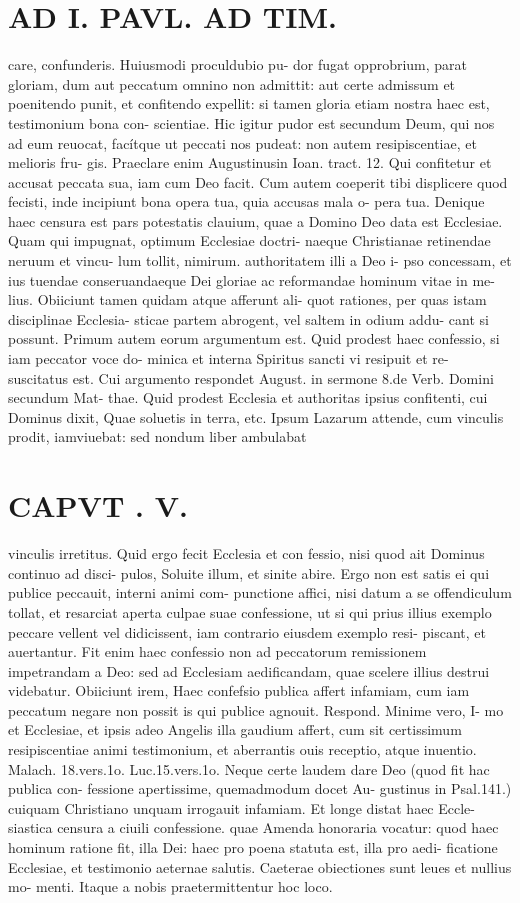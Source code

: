 \documentclass{article}
\begin{document}
\begin{pages}
\section*{AD I. PAVL. AD TIM. }
\marginpar{[ p.326 ]}care, confunderis. Huiusmodi proculdubio pu- dor fugat opprobrium, parat gloriam, dum aut peccatum omnino non admittit: aut certe admissum et poenitendo punit, et confitendo expellit: si tamen gloria etiam nostra haec est, testimonium bona con- scientiae. Hic igitur pudor est secundum Deum, qui nos ad eum reuocat, facítque ut peccati nos pudeat: non autem resipiscentiae, et melioris fru- gis. Praeclare enim Augustinusin Ioan. tract. 12. Qui confitetur et accusat peccata sua, iam cum Deo facit. Cum autem coeperit tibi displicere quod fecisti, inde incipiunt bona opera tua, quia accusas mala o- pera tua. Denique haec censura est pars potestatis clauium, quae a Domino Deo data est Ecclesiae. Quam qui impugnat, optimum Ecclesiae doctri- naeque Christianae retinendae neruum et vincu- lum tollit, nimirum. authoritatem illi a Deo i- pso concessam, et ius tuendae conseruandaeque Dei gloriae ac reformandae hominum vitae in me- lius. Obiiciunt tamen quidam atque afferunt ali- quot rationes, per quas istam disciplinae Ecclesia- sticae partem abrogent, vel saltem in odium addu- cant si possunt. Primum autem eorum argumentum est. Quid prodest haec confessio, si iam peccator voce do- minica et interna Spiritus sancti vi resipuit et re- suscitatus est. Cui argumento respondet August. in sermone 8.de Verb. Domini secundum Mat- thae. Quid prodest Ecclesia et authoritas ipsius confitenti, cui Dominus dixit, Quae soluetis in terra, etc. Ipsum Lazarum attende, cum vinculis prodit, iamviuebat: sed nondum liber ambulabat 
\section*{CAPVT . V. }
\marginpar{[ p.27 ]}vinculis irretitus. Quid ergo fecit Ecclesia et con fessio, nisi quod ait Dominus continuo ad disci- pulos, Soluite illum, et sinite abire. Ergo non est satis ei qui publice peccauit, interni animi com- punctione affici, nisi datum a se offendiculum tollat, et resarciat aperta culpae suae confessione, ut si qui prius illius exemplo peccare vellent vel didicissent, iam contrario eiusdem exemplo resi- piscant, et auertantur. Fit enim haec confessio non ad peccatorum remissionem impetrandam a Deo: sed ad Ecclesiam aedificandam, quae scelere illius destrui videbatur. Obiiciunt irem, Haec confefsio publica affert infamiam, cum iam peccatum negare non possit is qui publice agnouit. Respond. Minime vero, I- mo et Ecclesiae, et ipsis adeo Angelis illa gaudium affert, cum sit certissimum resipiscentiae animi testimonium, et aberrantis ouis receptio, atque inuentio. Malach. 18.vers.1o. Luc.15.vers.1o. Neque certe laudem dare Deo (quod fit hac publica con- fessione apertissime, quemadmodum docet Au- gustinus in Psal.141.) cuiquam Christiano unquam irrogauit infamiam. Et longe distat haec Eccle- siastica censura a ciuili confessione. quae Amenda honoraria vocatur: quod haec hominum ratione fit, illa Dei: haec pro poena statuta est, illa pro aedi- ficatione Ecclesiae, et testimonio aeternae salutis. Caeterae obiectiones sunt leues et nullius mo- menti. Itaque a nobis praetermittentur hoc loco.    

\end{pages}
\end{document}
